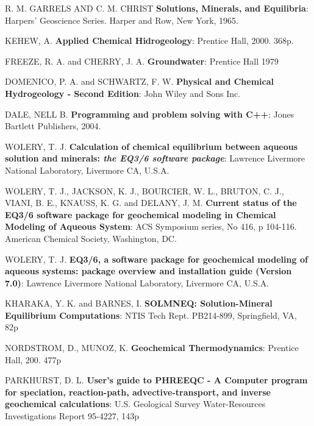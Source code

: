 \documentclass[ppgc,mestrado,english]{iiufrgs}
\begin{document}
\renewcommand*\bibname{References}
\begin{thebibliography}{este-parametro-nao-eh-usado-pelo-estilo-ABNT}

 R. M. GARRELS AND C. M. CHRIST
 \textbf{Solutions, Minerals, and Equilibria}: Harpers' Geoscience Series. Harper and Row, New York, 1965.

 KEHEW, A.
 \textbf{Applied Chemical Hidrogeology}: Prentice Hall, 2000. 368p.

 FREEZE, R. A. and CHERRY, J. A.
\textbf{Groundwater}: Prentice Hall 1979

 DOMENICO, P. A. and SCHWARTZ, F. W.
\textbf{Physical and Chemical Hydrogeology - Second Edition}: John Wiley and Sons Inc.

  DALE, NELL B.
 \textbf{Programming and problem solving with C++}: Jones Bartlett Publishers, 2004.
   
 WOLERY, T. J. 
\textbf{Calculation of chemical equilibrium between aqueous solution and minerals: \emph{the EQ3/6 software package}}: Lawrence Livermore National Laboratory, Livermore CA, U.S.A.

 WOLERY, T. J., JACKSON, K. J., BOURCIER, W. L., BRUTON, C. J., VIANI, B. E., KNAUSS, K. G. and DELANY, J. M.
\textbf{Current status of the EQ3/6 software package for geochemical modeling in Chemical Modeling of Aqueous System}: ACS Symposium series, No 416, p 104-116. American Chemical Society, Washington, DC.

 WOLERY, T. J.
\textbf{EQ3/6, a software package for geochemical modeling of aqueous systems: package overview and installation guide (Version 7.0)}: Lawrence Livermore National Laboratory, Livermore CA, U.S.A.

 KHARAKA, Y. K. and BARNES, I.
\textbf{SOLMNEQ: Solution-Mineral Equilibrium Computations}: NTIS Tech Rept. PB214-899, Springfield, VA, 82p

 NORDSTROM, D., MUNOZ, K.
\textbf{Geochemical Thermodynamics}: Prentice Hall, 200. 477p

 PARKHURST, D. L.
\textbf{User's guide to PHREEQC - A Computer program for speciation, reaction-path, advective-transport, and inverse geochemical calculations}: U.S. Geological Survey Water-Resources Investigations Report 95-4227, 143p


\end{thebibliography}
\end{document}
